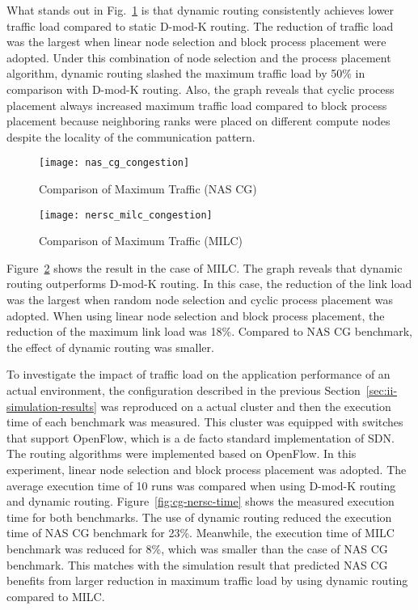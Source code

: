 What stands out in Fig.~\ref{fig:nas-cg-congestion} is that
dynamic routing consistently achieves lower traffic load compared to
static \mbox{D-mod-K} routing. The reduction of traffic load was the largest
when linear node selection and block process placement were adopted. Under
this combination of node selection and the process placement algorithm,
dynamic routing slashed the maximum traffic load by 50\% in comparison with
\mbox{D-mod-K} routing. Also, the graph reveals that cyclic process
placement always increased maximum traffic load compared to block process
placement because neighboring ranks were placed on different compute nodes
despite the locality of the communication pattern.

\begin{figure}
    \centering
    \texttt{[image: nas\_cg\_congestion]}
    \caption{Comparison of Maximum Traffic (NAS CG)}%
    \label{fig:nas-cg-congestion}
\end{figure}

\begin{figure}
    \centering
    \texttt{[image: nersc\_milc\_congestion]}
    \caption{Comparison of Maximum Traffic (MILC)}%
    \label{fig:nersc-milc-congestion}
\end{figure}

Figure~\ref{fig:nersc-milc-congestion} shows the result in the case of
MILC\@. The graph reveals that dynamic routing outperforms \mbox{D-mod-K}
routing. In this case, the reduction of the link load was the largest when
random node selection and cyclic process placement was adopted. When using
linear node selection and block process placement, the reduction of the
maximum link load was 18\%. Compared to NAS CG benchmark, the effect of
dynamic routing was smaller.

To investigate the impact of traffic load on the application performance of an
actual environment, the configuration described in the previous
Section~\ref{sec:ii-simulation-results} was reproduced on a actual cluster and
then the execution time of each benchmark was measured. This cluster was
equipped with switches that support OpenFlow, which is a de facto standard
implementation of SDN\@. The routing algorithms were implemented based on
OpenFlow. In this experiment, linear node selection and block process
placement was adopted. The average execution time of 10 runs was compared when
using \mbox{D-mod-K} routing and dynamic routing. Figure~\ref{fig:cg-nersc-time}
shows the measured execution time for both benchmarks. The use of dynamic
routing reduced the execution time of NAS CG benchmark for 23\%. Meanwhile,
the execution time of MILC benchmark was reduced for 8\%, which was smaller
than the case of NAS CG benchmark. This matches with the simulation result
that predicted NAS CG benefits from larger reduction in maximum traffic load
by using dynamic routing compared to MILC\@.

